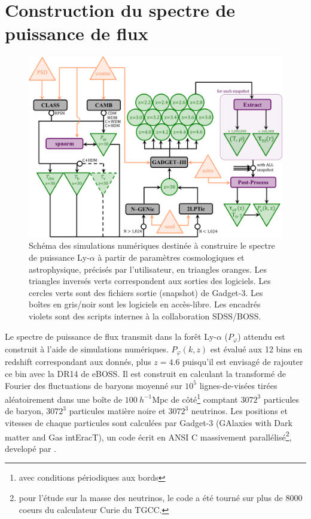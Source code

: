 \section{Construction du spectre de puissance de flux}

\begin{figure}
\begin{center}
\includegraphics[width=0.85\columnwidth]{Figures/Simu/pipeline.png}
\caption{Schéma des simulations numériques destinée à construire le spectre de puissance Ly-$\alpha$ à partir de paramètres cosmologiques et astrophysique, précisés par l'utilisateur, en triangles oranges. Les triangles inversés verts correspondent aux sorties des logiciels. Les cercles verts sont des fichiers sortie (snapshot) de \textsf{Gadget-3}. Les boîtes en gris/noir sont les logiciels en accès-libre. Les encadrés violets sont des scripts internes à la collaboration SDSS/BOSS.}
\label{fig:pipeline}
\end{center}
\end{figure}

Le spectre de puissance de flux transmit dans la forêt Ly-$\alpha$ ($P_\varphi$) attendu est construit à l'aide de simulations numériques. $P_\varphi (k, z)$ est évalué aux 12 bins en redshift correspondant aux donnés, plus $z=4.6$ puisqu'il est envisagé de rajouter ce bin avec la DR14 de eBOSS. Il est construit en calculant la transformé de Fourier des fluctuations de baryons moyenné sur $10^5$ lignes-de-visées tirées aléatoirement dans une boîte de $100~h^{-1}\mathrm{Mpc}$ de côté\footnote{avec conditions périodiques aux bords} comptant $3072^3$ particules de baryon, $3072^3$ particules matière noire et $3072^3$ neutrinos. Les positions et vitesses de chaque particules sont calculées par \textsf{Gadget-3} (GAlaxies with Dark matter and Gas intEracT), un code écrit en ANSI C massivement parallélisé\footnote{pour l'étude sur la masse des neutrinos, le code a été tourné sur plus de $8000$ coeurs du calculateur \textsf{Curie} du TGCC.}, developé par \cite{Springel2001, Springel2005}.  \\

